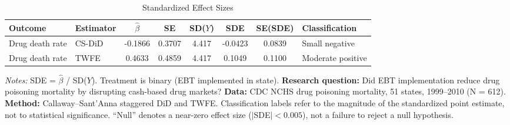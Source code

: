 \begin{table}[H]
\centering
\caption{Standardized Effect Sizes}
\label{tab:sde}
\small
\begin{adjustbox}{max width=\textwidth}
\begin{tabular}{llcccccl}
\toprule
Outcome & Estimator & $\hat{\beta}$ & SE & SD($Y$) & SDE & SE(SDE) & Classification \\
\midrule
Drug death rate & CS-DiD & -0.1866 & 0.3707 & 4.417 & -0.0423 & 0.0839 & Small negative \\
Drug death rate & TWFE & 0.4633 & 0.4859 & 4.417 & 0.1049 & 0.1100 & Moderate positive \\
\bottomrule
\end{tabular}
\end{adjustbox}
\par\vspace{0.3em}
{\footnotesize \emph{Notes:} SDE = $\hat{\beta}$ / SD($Y$). Treatment is binary (EBT implemented in state). \textbf{Research question:} Did EBT implementation reduce drug poisoning mortality by disrupting cash-based drug markets? \textbf{Data:} CDC NCHS drug poisoning mortality, 51 states, 1999--2010 (N = 612). \textbf{Method:} Callaway--Sant'Anna staggered DiD and TWFE. Classification labels refer to the magnitude of the standardized point estimate, not to statistical significance. ``Null'' denotes a near-zero effect size ($|$SDE$| < 0.005$), not a failure to reject a null hypothesis.}
\end{table}
